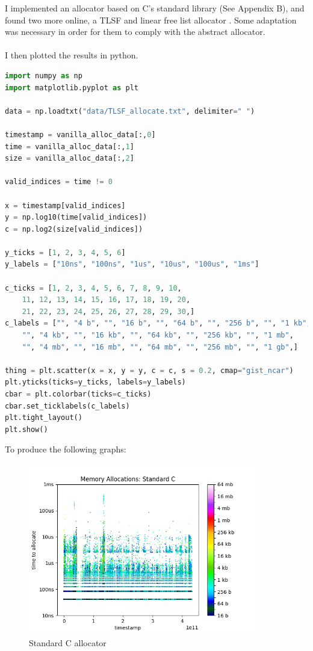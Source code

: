 \documentclass{article}
\begin{document}
I implemented an allocator based on C's standard library (See Appendix B), and found two more online, a TLSF \cite{TLSF-implementation} and linear free list allocator \cite{free-list-implementation}. Some adaptation was necessary in order for them to comply with the abstract allocator.\\
\\
I then plotted the results in python.\\
\begin{lstlisting}[language=Python]
import numpy as np
import matplotlib.pyplot as plt
	
data = np.loadtxt("data/TLSF_allocate.txt", delimiter=" ")
	
timestamp = vanilla_alloc_data[:,0]
time = vanilla_alloc_data[:,1]
size = vanilla_alloc_data[:,2]

valid_indices = time != 0
	
x = timestamp[valid_indices]
y = np.log10(time[valid_indices])
c = np.log2(size[valid_indices])
	
y_ticks = [1, 2, 3, 4, 5, 6]
y_labels = ["10ns", "100ns", "1us", "10us", "100us", "1ms"]
	
c_ticks = [1, 2, 3, 4, 5, 6, 7, 8, 9, 10,
	11, 12, 13, 14, 15, 16, 17, 18, 19, 20,
	21, 22, 23, 24, 25, 26, 27, 28, 29, 30,]
c_labels = ["", "4 b", "", "16 b", "", "64 b", "", "256 b", "", "1 kb",
	"", "4 kb", "", "16 kb", "", "64 kb", "", "256 kb", "", "1 mb",
	"", "4 mb", "", "16 mb", "", "64 mb", "", "256 mb", "", "1 gb",]
	
thing = plt.scatter(x = x, y = y, c = c, s = 0.2, cmap="gist_ncar")
plt.yticks(ticks=y_ticks, labels=y_labels)
cbar = plt.colorbar(ticks=c_ticks)
cbar.set_ticklabels(c_labels)
plt.tight_layout()
plt.show()
\end{lstlisting}
\pagebreak
To produce the following graphs:\\
\begin{figure}[htbp]
	\centering
	\includegraphics[width=10cm]{results_vanilla_alloc}
	\captionsetup{width=10cm}
	\caption{Standard C allocator}
\end{figure}
\end{document}
